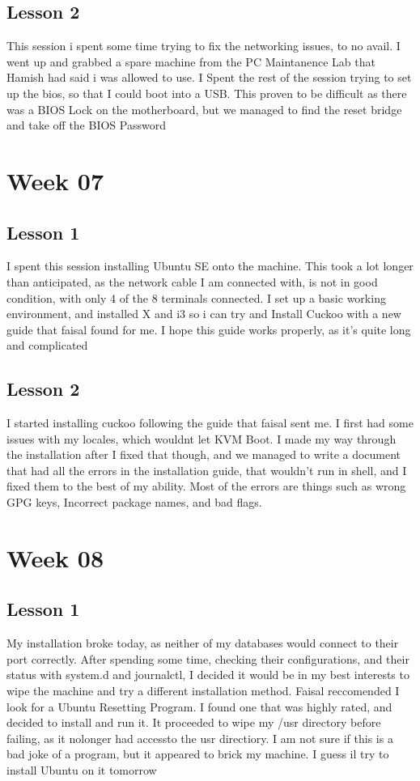 \documentclass{article}
\begin{document}
\subsection{Lesson 2}
This session i spent some time trying to fix the networking issues, to no avail. I went up and grabbed a spare machine from the PC Maintanence Lab that Hamish had said i was allowed to use. I Spent the rest of the session trying to set up the bios, so that I could boot into a USB. This proven to be difficult as there was a BIOS Lock on the motherboard, but we managed to find the reset bridge and take off the BIOS Password
\section{Week 07}
\subsection{Lesson 1}
I spent this session installing Ubuntu SE onto the machine. This took a lot longer than anticipated, as the network cable I am connected with, is not in good condition, with only 4 of the 8 terminals connected. I set up a basic working environment, and installed X and i3 so i can try and Install Cuckoo with a new guide that faisal found for me. I hope this guide works properly, as it's quite long and complicated
\subsection{Lesson 2}
I started installing cuckoo following the guide that faisal sent me. I first had some issues with my locales, which wouldnt let KVM Boot. I made my way through the installation after I fixed that though, and we managed to write a document that had all the errors in the installation guide, that wouldn't run in shell, and I fixed them to the best of my ability. Most of the errors are things such as wrong GPG keys, Incorrect package names, and bad flags.
\section{Week 08}
\subsection{Lesson 1}
My installation broke today, as neither of my databases would connect to their port correctly. After spending some time, checking their configurations, and their status with system.d and journalctl, I decided it would be in my best interests to wipe the machine and try a different installation method. Faisal reccomended I look for a Ubuntu Resetting Program. I found one that was highly rated, and decided to install and run it. It proceeded to wipe my /usr directory before failing, as it nolonger had accessto the usr directiory. I am not sure if this is a bad joke of a program, but it appeared to brick my machine. I guess il try to install Ubuntu on it tomorrow
\end{document}
